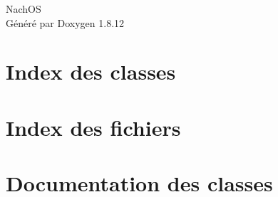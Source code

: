 \documentclass[twoside]{article}
\newcommand{\+}{\discretionary{\mbox{\scriptsize$\hookleftarrow$}}{}{}}
\begin{document}
\hypersetup{pageanchor=false,
             bookmarksnumbered=true,
             pdfencoding=unicode
            }
\begin{titlepage}
\vspace*{7cm}
\begin{center}%
{\Large Nach\+OS }\\
\vspace*{1cm}
{\large Généré par Doxygen 1.8.12}\\
\end{center}
\end{titlepage}
\tableofcontents
{}
\hypersetup{pageanchor=true}

\section{Index des classes}

\section{Index des fichiers}

\section{Documentation des classes}


















































\end{document}
